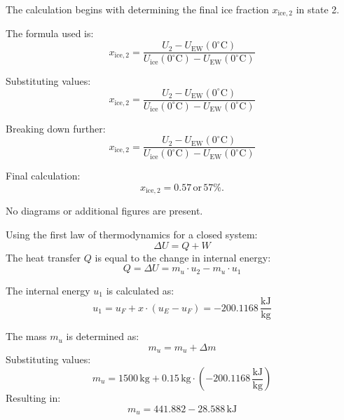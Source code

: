 The calculation begins with determining the final ice fraction \( x_{\text{ice},2} \) in state 2.  

The formula used is:  
\[
x_{\text{ice},2} = \frac{U_2 - U_{\text{EW}}(0^\circ\text{C})}{U_{\text{ice}}(0^\circ\text{C}) - U_{\text{EW}}(0^\circ\text{C})}
\]

Substituting values:  
\[
x_{\text{ice},2} = \frac{U_2 - U_{\text{EW}}(0^\circ\text{C})}{U_{\text{ice}}(0^\circ\text{C}) - U_{\text{EW}}(0^\circ\text{C})}
\]

Breaking down further:  
\[
x_{\text{ice},2} = \frac{U_2 - U_{\text{EW}}(0^\circ\text{C})}{U_{\text{ice}}(0^\circ\text{C}) - U_{\text{EW}}(0^\circ\text{C})}
\]

Final calculation:  
\[
x_{\text{ice},2} = 0.57 \, \text{or} \, 57\%.
\]  

No diagrams or additional figures are present.

Using the first law of thermodynamics for a closed system:  
\[
\Delta U = Q + W
\]  
The heat transfer \( Q \) is equal to the change in internal energy:  
\[
Q = \Delta U = m_u \cdot u_2 - m_u \cdot u_1
\]  

The internal energy \( u_1 \) is calculated as:  
\[
u_1 = u_F + x \cdot (u_E - u_F) = -200.1168 \, \frac{\text{kJ}}{\text{kg}}
\]  

The mass \( m_u \) is determined as:  
\[
m_u = m_u + \Delta m
\]  
Substituting values:  
\[
m_u = 1500 \, \text{kg} + 0.15 \, \text{kg} \cdot (-200.1168 \, \frac{\text{kJ}}{\text{kg}})
\]  
Resulting in:  
\[
m_u = 441.882 - 28.588 \, \text{kJ}
\]